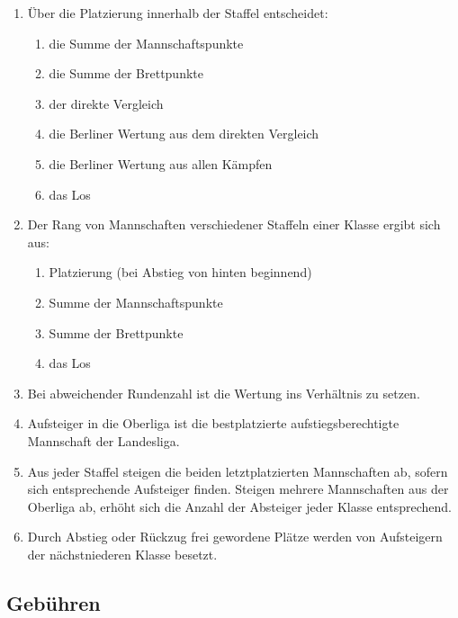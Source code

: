 \documentclass[fontsize=12pt, paper=a4, ngerman]{article}
\begin{document}
\begin{enumerate}
\item Über die Platzierung innerhalb der Staffel entscheidet:
  \begin{enumerate}[label=\alph*.]
  \item die Summe der Mannschaftspunkte
  \item die Summe der Brettpunkte
  \item der direkte Vergleich
  \item die Berliner Wertung aus dem direkten Vergleich
  \item die Berliner Wertung aus allen Kämpfen
  \item das Los
  \end{enumerate}
\item Der Rang von Mannschaften verschiedener Staffeln einer Klasse ergibt sich aus:
  \begin{enumerate}[label=\alph*.]
  \item Platzierung (bei Abstieg von hinten beginnend)
  \item Summe der Mannschaftspunkte
  \item Summe der Brettpunkte
  \item das Los
  \end{enumerate}
\item Bei abweichender Rundenzahl ist die Wertung ins Verhältnis zu setzen.
\item Aufsteiger in die Oberliga ist die bestplatzierte aufstiegsberechtigte Mannschaft der Landesliga.
\item Aus jeder Staffel steigen die beiden letztplatzierten Mannschaften ab, sofern sich entsprechende Aufsteiger finden.
Steigen mehrere Mannschaften aus der Oberliga ab, erhöht sich die Anzahl der Absteiger jeder Klasse entsprechend.
\item Durch Abstieg oder Rückzug frei gewordene Plätze werden von Aufsteigern der nächstniederen Klasse besetzt.

\end{enumerate}

\subsection{Gebühren}
\end{document}
